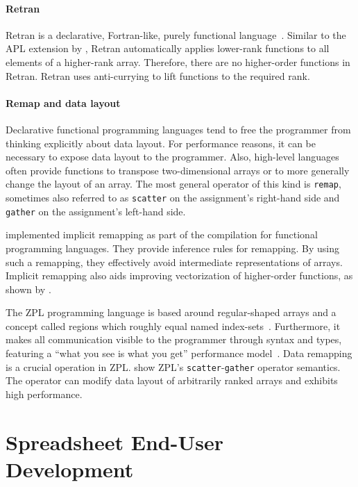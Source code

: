 \documentclass[a4paper]{article}
\begin{document}
\paragraph{Retran}

Retran is a declarative, Fortran-like, purely functional
language~\cite{367042}. Similar to the APL extension by
\citet{Lowney:1981:CAI:567532.567533}, Retran automatically applies
lower-rank functions to all elements of a higher-rank
array. Therefore, there are no higher-order functions in
Retran. Retran uses anti-currying to lift functions to the required
rank.

\paragraph{Remap and data layout}

Declarative functional programming languages tend to free the
programmer from thinking explicitly about data layout. For performance
reasons, it can be necessary to expose data layout to the
programmer. Also, high-level languages often provide functions to
transpose two-dimensional arrays or to more generally change the
layout of an array. The most general operator of this kind is
\texttt{remap}, sometimes also referred to as \texttt{scatter} on the
assignment's right-hand side and \texttt{gather} on the assignment's
left-hand side.

\citet{Walinsky:1990:FPL:91556.91610} implemented implicit remapping
as part of the compilation for functional programming languages. They
provide inference rules for remapping. By using such a remapping, they
effectively avoid intermediate representations of arrays. Implicit
remapping also aids improving vectorization of higher-order functions,
as shown by \citet{Sinkarovs:2013:SDL:2502323.2502332}.

The ZPL programming language is based around regular-shaped arrays and
a concept called regions which roughly equal named
index-sets~\cite{Chamberlain1999Regions}. Furthermore, it makes all
communication visible to the programmer through syntax and types,
featuring a ``what you see is what you get'' performance
model~\cite{Chamberlain1998ZPLs}. Data remapping is a crucial
operation in ZPL.\@ \citet{Deitz:2003:DIP:781498.781526} show ZPL's
\texttt{scatter}-\texttt{gather} operator semantics. The operator can
modify data layout of arbitrarily ranked arrays and exhibits high
performance.

\section{Spreadsheet End-User Development}
\label{sec:spreadsheet-end-user-dev}



\end{document}
